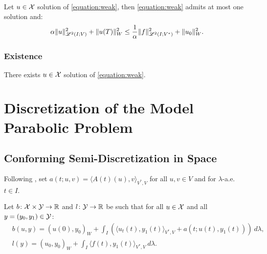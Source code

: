 \begin{lemma}
    Let $u \in \mathcal{X}$ solution of \eqref{equation:weak}, then \eqref{equation:weak} admits at most one solution and:
    \begin{gather}
        \alpha \lVert u \rVert_{\mathscr{L}^{2}(I; V)}^2 + \lVert u(T) \rVert_W^2 \leq \frac{1}{\alpha} \lVert f \rVert_{\mathscr{L}^{2}(I; V^*)}^2 + \lVert u_0 \rVert_W^2.
    \end{gather}
\end{lemma}



\subsubsection{Existence}

\begin{lemma}[Existence]
    There exists $u \in \mathcal{X}$ solution of \eqref{equation:weak}.
\end{lemma}


\newpage
\section{Discretization of the Model Parabolic Problem}

\subsection{Conforming Semi-Discretization in Space}

Following \cite[p. 135]{Ern2021}, set $a(t; u, v) = \langle A(t)(u), v \rangle_{V^*, V}$ for all $u, v \in V$ and for $\lambda$-a.e. $t \in I$.

\begin{definition}[$b$ and $l$]
    Let $b \colon \mathcal{X} \times \mathcal{Y} \rightarrow \mathbb{R}$ and $l \colon \mathcal{Y} \rightarrow \mathbb{R}$ be such that for all $u \in \mathcal{X}$ and all $y = (y_0, y_1) \in \mathcal{Y}$:
    \begin{align}
        & b(u, y) = \left( u(0), y_0 \right)_W + \int_I \left( \langle u_t(t), y_1(t) \rangle_{V^*, V} + a(t; u(t), y_1(t)) \right)~ d \lambda, \\
        & l(y) = \left( u_0, y_0 \right)_W + \int_I \langle f(t), y_1(t) \rangle_{V^*, V} ~ d \lambda.
    \end{align}
\end{definition}

